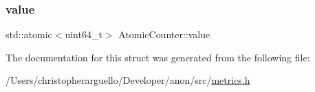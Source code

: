 \subsubsection{\texorpdfstring{value}{value}}
{\footnotesize\ttfamily std\+::atomic$<$uint64\+\_\+t$>$ Atomic\+Counter\+::value}



The documentation for this struct was generated from the following file\+:\begin{DoxyCompactItemize}
\item 
/\+Users/christopherarguello/\+Developer/anon/src/\mbox{\hyperlink{metrics_8h}{metrics.\+h}}\end{DoxyCompactItemize}
